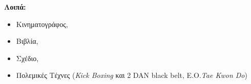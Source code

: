 \documentclass[print]{keros-cv} %
\begin{document}
\textbf{Λοιπά:}
\begin{itemize}
\item[] Κινηματογράφος, 
\item[] Βιβλία, 
\item[] Σχέδιο, 
\item[] Πολεμικές Τέχνες (\textit{Kick Boxing} και 2 DAN black belt, Ε.Ο.\textit{Tae Kwon Do}) 
\end{itemize}
%
%
%
%
%
%
%

\end{document}
